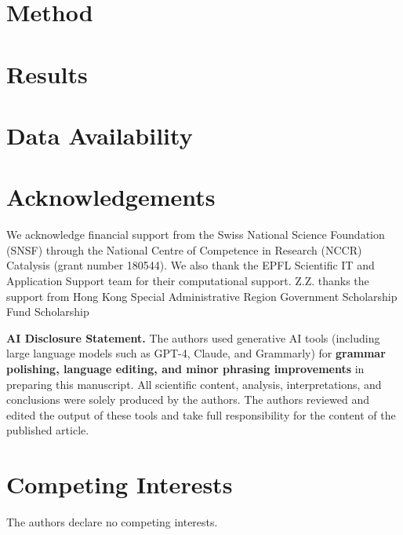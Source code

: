 \documentclass[%
 preprint,
superscriptaddress,
 amsmath,amssymb,
 aps,
 linenumbers,
]{revtex4-2}
\begin{document}
\section{Method}


\section{Results}





\section*{Data Availability}





\section*{Acknowledgements}
We acknowledge financial support from the Swiss National Science Foundation (SNSF) through the National Centre of Competence in Research (NCCR) Catalysis (grant number 180544). We also thank the EPFL Scientific IT and Application Support team for their computational support. Z.Z. thanks the support from Hong Kong Special Administrative Region Government Scholarship Fund Scholarship

\textbf{AI Disclosure Statement.}
The authors used generative AI tools (including large language models such as GPT-4, Claude, and Grammarly) for \textbf{grammar polishing, language editing, and minor phrasing improvements} in preparing this manuscript. All scientific content, analysis, interpretations, and conclusions were solely produced by the authors. The authors reviewed and edited the output of these tools and take full responsibility for the content of the published article.


\section*{Competing Interests}

The authors declare no competing interests.



\end{document}
